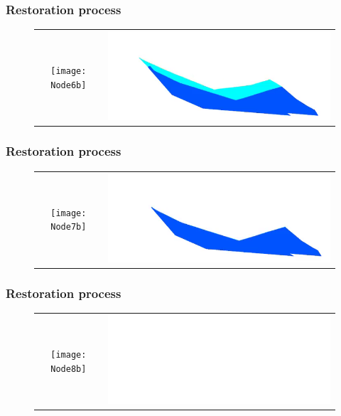 \documentclass{beamer}
\begin{document}
	\begin{frame}
	\frametitle{Restoration process}
	\begin{figure}[H]
	\centering
	\begin{tabular}{@{}cc@{}}
	\texttt{[image: Node6b]}&
	\includegraphics[width=.65\textwidth]{chartreusedroite29.png}\\
	\end{tabular}
	\end{figure}
	\end{frame}
		\begin{frame}
	\frametitle{Restoration process}
	\begin{figure}[H]
	\centering
	\begin{tabular}{@{}cc@{}}
	\texttt{[image: Node7b]}&
	\includegraphics[width=.65\textwidth]{chartreusedroite210.png}\\
	\end{tabular}
	\end{figure}
	\end{frame}
	
	\begin{frame}
	\frametitle{Restoration process}
	\begin{figure}[H]
	\centering
	\begin{tabular}{@{}cc@{}}
	\texttt{[image: Node8b]}&
	\includegraphics[width=.65\textwidth]{chartreusedroite10.png}\\
	\end{tabular}
	\end{figure}
	\end{frame}
\end{document}
